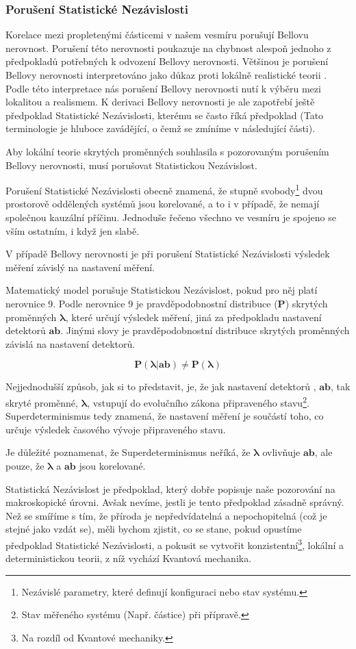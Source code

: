 \clearpage

\subsubsection{Porušení Statistické Nezávislosti}
Korelace mezi propletenými částicemi v našem vesmíru porušují Bellovu nerovnost. Porušení této nerovnosti poukazuje na chybnost alespoň jednoho z předpokladů potřebných k odvození Bellovy nerovnosti. Většinou je porušení Bellovy nerovnosti interpretováno jako důkaz proti lokálně realistické teorii \parencite{belltest:violation}. Podle této interpretace nás porušení Bellovy nerovnosti nutí k výběru mezi lokalitou a realismem. K derivaci Bellovy nerovnosti je ale zapotřebí ještě předpoklad Statistické Nezávislosti, kterému se často říká předpoklad  (Tato terminologie je hluboce zavádějící, o čemž se zmíníme v následující části).

Aby lokální teorie skrytých proměnných souhlasila s pozorovaným porušením Bellovy nerovnosti, musí porušovat Statistickou Nezávislost.

Porušení Statistické Nezávislosti obecně znamená, že stupně svobody\footnote[10]{Nezávislé parametry, které definují konfiguraci nebo stav systému.} dvou prostorově oddělených systémů jsou korelované, a to i v případě, že nemají společnou kauzální příčinu. Jednoduše řečeno všechno ve vesmíru je spojeno se vším ostatním, i když jen slabě. 

V případě Bellovy nerovnosti je při porušení Statistické Nezávislosti výsledek měření závislý na nastavení měření. 

Matematický model porušuje Statistickou Nezávislost, pokud pro něj platí nerovnice 9. Podle nerovnice 9 je pravděpodobnostní distribuce ($\bm{P}$) skrytých proměnných $\bm{\lambda}$, které určují výsledek měření, jiná za předpokladu nastavení detektorů $\bm{ab}$. Jinými slovy je pravděpodobnostní distribuce skrytých proměnných závislá na nastavení detektorů.

\begin{equation}
    \bm{P(\lambda|ab) \neq P(\lambda)}
    \label{eq:9}
\end{equation}

Nejjednodušší způsob, jak si to představit, je, že jak nastavení detektorů , $\bm{ab}$, tak skryté proměnné, $\bm{\lambda}$, vstupují do evolučního zákona připraveného stavu\footnote[11]{Stav měřeného systému (Např. částice) při přípravě.}. Superdeterminismus tedy znamená, že nastavení měření je součástí toho, co určuje výsledek časového vývoje připraveného stavu.

Je důležité poznamenat, že Superdeterminismus neříká, že $\bm{\lambda}$ ovlivňuje $\bm{ab}$, ale pouze, že $\bm{\lambda}$ a $\bm{ab}$ jsou korelované.

Statistická Nezávislost je předpoklad, který dobře popisuje naše pozorování na ma\-kroskopické úrovni. Avšak nevíme, jestli je tento předpoklad zásadně správný. Než se smíříme s tím, že příroda je nepředvídatelná a nepochopitelná (což je stejné jako vzdát se), měli bychom zjistit, co se stane, pokud opustíme předpoklad Statistické Nezávislosti, a pokusit se vytvořit konzistentní\footnote[12]{Na rozdíl od Kvantové mechaniky.}, lokální a deterministickou teorii, z níž vychází Kvantová mechanika.

